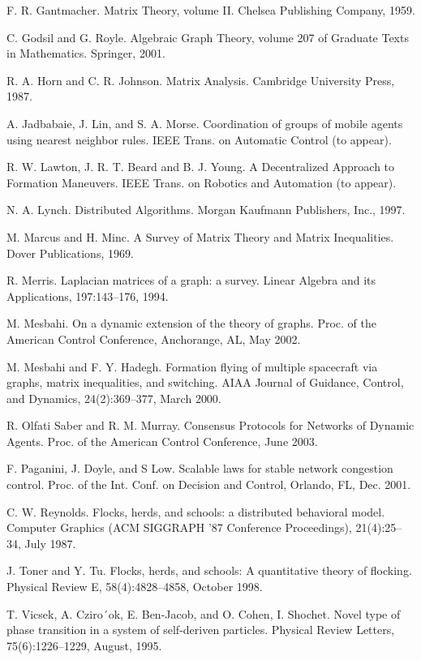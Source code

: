 \documentclass{article}
\begin{document}
\noindent [10] F. R. Gantmacher. Matrix Theory, volume II. Chelsea Publishing Company, 1959. 

\noindent [11] C. Godsil and G. Royle. Algebraic Graph Theory, volume 207 of Graduate Texts in Mathematics. Springer, 2001. 

\noindent [12] R. A. Horn and C. R. Johnson. Matrix Analysis. Cambridge University Press, 1987. 

\noindent [13] A. Jadbabaie, J. Lin, and S. A. Morse. Coordination of groups of mobile agents using nearest neighbor rules. IEEE Trans. on Automatic Control (to appear). 

\noindent [14] R. W. Lawton, J. R. T. Beard and B. J. Young. A Decentralized Approach to Formation Maneuvers. IEEE Trans. on Robotics and Automation (to appear). 

\noindent [15] N. A. Lynch. Distributed Algorithms. Morgan Kaufmann Publishers, Inc., 1997. 

\noindent [16] M. Marcus and H. Minc. A Survey of Matrix Theory and Matrix Inequalities. Dover Publications, 1969. 

\noindent [17] R. Merris. Laplacian matrices of a graph: a survey. Linear Algebra and its Applications, 197:143–176, 1994. 

\noindent [18] M. Mesbahi. On a dynamic extension of the theory of graphs. Proc. of the American Control Conference, Anchorange, AL, May 2002. 

\noindent [19] M. Mesbahi and F. Y. Hadegh. Formation ﬂying of multiple spacecraft via graphs, matrix inequalities, and switching. AIAA Journal of Guidance, Control, and Dynamics, 24(2):369–377, March 2000. 

\noindent [20] R. Olfati Saber and R. M. Murray. Consensus Protocols for Networks of Dynamic Agents. Proc. of the American Control Conference, June 2003. 

\noindent [21] F. Paganini, J. Doyle, and S Low. Scalable laws for stable network congestion control. Proc. of the Int. Conf. on Decision and Control, Orlando, FL, Dec. 2001. 

\noindent [22] C. W. Reynolds. Flocks, herds, and schools: a distributed behavioral model. Computer Graphics (ACM SIGGRAPH ’87 Conference Proceedings), 21(4):25–34, July 1987. 

\noindent [23] J. Toner and Y. Tu. Flocks, herds, and schools: A quantitative theory of ﬂocking. Physical Review E, 58(4):4828–4858, October 1998. 

\noindent [24] T. Vicsek, A. Cziro´ok, E. Ben-Jacob, and O. Cohen, I. Shochet. Novel type of phase transition in a system of self-deriven particles. Physical Review Letters, 75(6):1226–1229, August, 1995.
\end{document}
